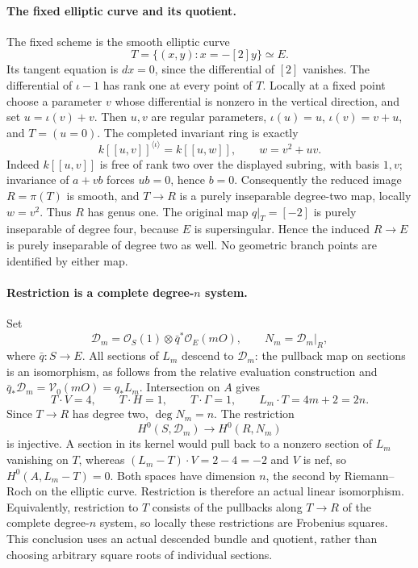 \paragraph{The fixed elliptic curve and its quotient.}
The fixed scheme is the smooth elliptic curve
\[
                   T=\{(x,y):x=-[2]y\}\simeq E.
\]
Its tangent equation is \(dx=0\), since the differential of \([2]\)
vanishes. The differential of \(\iota-1\) has rank one at every
point of \(T\). Locally at a fixed point choose a parameter \(v\)
whose differential is nonzero in the vertical direction, and set
\(u=\iota(v)+v\). Then \(u,v\) are regular parameters,
\(\iota(u)=u\), \(\iota(v)=v+u\), and \(T=(u=0)\).
The completed invariant ring is exactly
\[
 k[[u,v]]^{\langle\iota\rangle}
                  =k[[u,w]],\qquad w=v^2+uv.
\]
Indeed \(k[[u,v]]\) is free of rank two over the displayed
subring, with basis \(1,v\); invariance of \(a+vb\) forces
\(ub=0\), hence \(b=0\). Consequently the reduced image
\(R=\pi(T)\) is smooth, and \(T\to R\) is a purely inseparable
degree-two map, locally \(w=v^2\). Thus \(R\) has genus one.
The original map \(q|_T=[-2]\) is purely inseparable of degree four,
because \(E\) is supersingular. Hence the induced \(R\to E\)
is purely inseparable of degree two as well. No geometric branch
points are identified by either map.

\paragraph{Restriction is a complete degree-\(n\) system.}
Set
\[
 \mathcal D_m=\mathcal O_S(1)\otimes\bar q^*\mathcal O_E(mO),
 \qquad N_m=\mathcal D_m|_R,
\]
where \(\bar q:S\to E\). All sections of \(L_m\) descend to
\(\mathcal D_m\): the pullback map on sections is an isomorphism,
as follows from the relative evaluation construction and
\(\bar q_*\mathcal D_m=\mathcal V_0(mO)=q_*L_m\).
Intersection on \(A\) gives
\[
 T\cdot V=4,\qquad T\cdot H=1,\qquad T\cdot\Gamma=1,
 \qquad L_m\cdot T=4m+2=2n.
\]
Since \(T\to R\) has degree two, \(\deg N_m=n\).
The restriction
\[
          H^0(S,\mathcal D_m)\longrightarrow H^0(R,N_m)
\]
is injective. A section in its kernel would pull back to a
nonzero section of \(L_m\) vanishing on \(T\), whereas
\((L_m-T)\cdot V=2-4=-2\) and \(V\) is nef, so
\(H^0(A,L_m-T)=0\). Both spaces have dimension \(n\), the
second by Riemann--Roch on the elliptic curve. Restriction is
therefore an actual linear isomorphism. Equivalently, restriction
to \(T\) consists of the pullbacks along \(T\to R\) of the
complete degree-\(n\) system, so locally these restrictions are
Frobenius squares. This conclusion uses an actual descended
bundle and quotient, rather than choosing arbitrary square roots
of individual sections.

